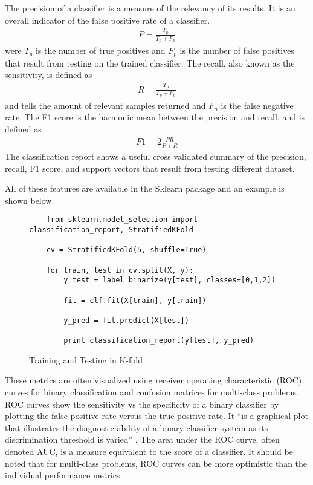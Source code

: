 The precision of a classifier is a measure of the relevancy of its results.  It is an overall indicator of the false positive rate of a classifier.
%
\begin{align}
    P = \frac{T_p}{T_p + F_p}
\end{align}
%
were $T_p$ is the number of true positives and $F_p$ is the number of false positives that result from testing on the trained classifier.  The recall, also known as the sensitivity, is defined as
%
\begin{align}
    R = \frac{T_p}{T_p + F_n}
\end{align}
%
and tells the amount of relevant samples returned and $F_n$ is the false negative rate.  The F1 score is the harmonic mean between the precision and recall, and is defined as
%
\begin{align}
    F1 = 2\frac{PR}{P + R}
\end{align}
%
The classification report shows a useful cross validated summary of the precision, recall, F1 score, and support vectors that result from testing different dataset.

All of these features are available in the Sklearn package and an example is shown below.
%
%
\begin{figure}
    \begin{lstlisting}
    from sklearn.model_selection import classification_report, StratifiedKFold

    cv = StratifiedKFold(5, shuffle=True)

    for train, test in cv.split(X, y):
        y_test = label_binarize(y[test], classes=[0,1,2])

        fit = clf.fit(X[train], y[train])

        y_pred = fit.predict(X[test])

        print classification_report(y[test], y_pred)
    \end{lstlisting}
    \caption{Training and Testing in K-fold}
    \label{fig:scattering}
\end{figure}
These metrics are often visualized using receiver operating characteristic (ROC) curves for binary classification and confusion matrices for multi-class problems.  ROC curves show the sensitivity vs the specificity of a binary classifier by plotting the false positive rate versus the true positive rate.  It “is a graphical plot that illustrates the diagnostic ability of a binary classifier system as its discrimination threshold is varied” \cite{wikiroc}. The area under the ROC curve, often denoted AUC, is a measure equivalent to the score of a classifier. It should be noted that for multi-class problems, ROC curves can be more optimistic than the individual performance metrics.

